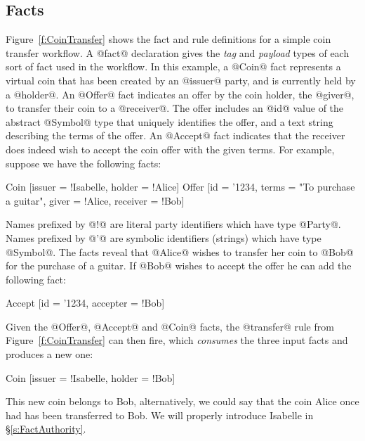 \subsection{Facts}
\label{s:Facts}
Figure~\ref{f:CoinTransfer} shows the fact and rule definitions for a simple coin transfer workflow. A @fact@ declaration gives the \emph{tag} and \emph{payload} types of each sort of fact used in the workflow. In this example, a @Coin@ fact represents a virtual coin that has been created by an @issuer@ party, and is currently held by a @holder@. An @Offer@ fact indicates an offer by the coin holder, the @giver@, to transfer their coin to a @receiver@. The offer includes an @id@ value of the abstract @Symbol@ type that uniquely identifies the offer, and a text string describing the terms of the offer. An @Accept@ fact indicates that the receiver does indeed wish to accept the coin offer with the given terms. For example, suppose we have the following facts:
\begin{small}
\begin{code}
 Coin   [issuer = !Isabelle, holder = !Alice]
 Offer  [id     = '1234,  terms    = "To purchase a guitar",
         giver  = !Alice, receiver = !Bob]
\end{code}
\end{small}

Names prefixed by @!@ are literal party identifiers which have type @Party@. Names prefixed by @'@ are symbolic identifiers (strings) which have type @Symbol@. The facts reveal that @Alice@ wishes to transfer her coin to @Bob@ for the purchase of a guitar. If @Bob@ wishes to accept the offer he can add the following fact:
\begin{small}
\begin{code}
 Accept [id = '1234, accepter = !Bob]
\end{code}
\end{small}

Given the @Offer@, @Accept@ and @Coin@ facts, the @transfer@ rule from Figure~\ref{f:CoinTransfer} can then fire, which \emph{consumes} the three input facts and produces a new one:
\begin{small}
\begin{code}
 Coin   [issuer = !Isabelle, holder = !Bob]
\end{code}
\end{small}

This new coin belongs to Bob, alternatively, we could say that the coin Alice once had has been transferred to Bob. We will properly introduce Isabelle in \S\ref{s:FactAuthority}.


